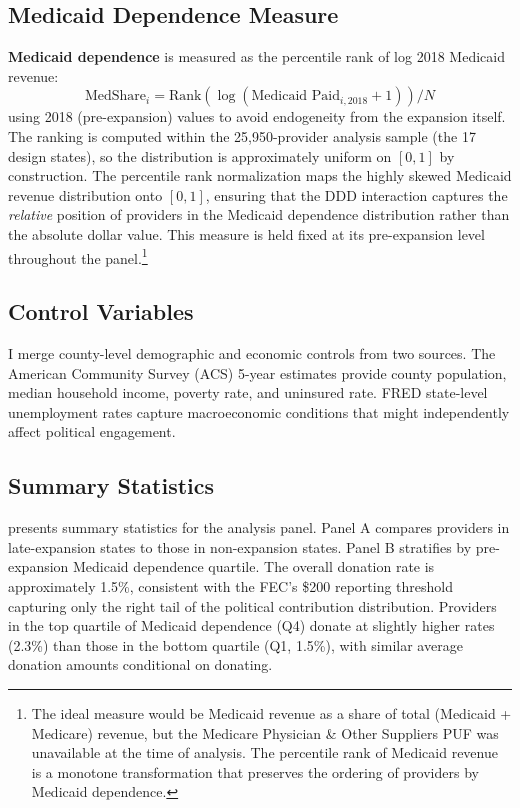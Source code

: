 \documentclass[12pt]{article}
\begin{document}
\subsection{Medicaid Dependence Measure}

\textbf{Medicaid dependence} is measured as the percentile rank of log 2018 Medicaid revenue:
\begin{equation}
    \text{MedShare}_i = \text{Rank}\left(\log(\text{Medicaid Paid}_{i,2018} + 1)\right) / N
\end{equation}
using 2018 (pre-expansion) values to avoid endogeneity from the expansion itself. The ranking is computed within the 25,950-provider analysis sample (the 17 design states), so the distribution is approximately uniform on $[0, 1]$ by construction. The percentile rank normalization maps the highly skewed Medicaid revenue distribution onto $[0, 1]$, ensuring that the DDD interaction captures the \textit{relative} position of providers in the Medicaid dependence distribution rather than the absolute dollar value. This measure is held fixed at its pre-expansion level throughout the panel.\footnote{The ideal measure would be Medicaid revenue as a share of total (Medicaid + Medicare) revenue, but the Medicare Physician \& Other Suppliers PUF was unavailable at the time of analysis. The percentile rank of Medicaid revenue is a monotone transformation that preserves the ordering of providers by Medicaid dependence.}

\subsection{Control Variables}

I merge county-level demographic and economic controls from two sources. The American Community Survey (ACS) 5-year estimates provide county population, median household income, poverty rate, and uninsured rate. FRED state-level unemployment rates capture macroeconomic conditions that might independently affect political engagement.

\subsection{Summary Statistics}

 presents summary statistics for the analysis panel. Panel A compares providers in late-expansion states to those in non-expansion states. Panel B stratifies by pre-expansion Medicaid dependence quartile. The overall donation rate is approximately 1.5\%, consistent with the FEC's \$200 reporting threshold capturing only the right tail of the political contribution distribution. Providers in the top quartile of Medicaid dependence (Q4) donate at slightly higher rates (2.3\%) than those in the bottom quartile (Q1, 1.5\%), with similar average donation amounts conditional on donating.
\end{document}
